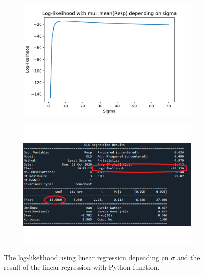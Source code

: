 \documentclass{article}
\begin{document}
\begin{figure}[H]
    \centering
    \begin{subfigure}[b]{0.7\textwidth}
        \includegraphics[width=\textwidth]{./images/Log_likelihood.pdf}
    \end{subfigure}
    \begin{subfigure}[b]{0.8\textwidth}
        \includegraphics[width=\textwidth]{./images/OLS_Regression.pdf}
    \end{subfigure}
    \caption{The log-likelihood using linear regression depending on $\sigma$ and the result of the linear regression with Python function. }
\end{figure}
\end{document}

